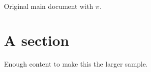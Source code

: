 \documentclass{article}
\begin{document}
Original main document with $\pi$.
\section{A section}
Enough content to make this the larger sample.
\end{document}
